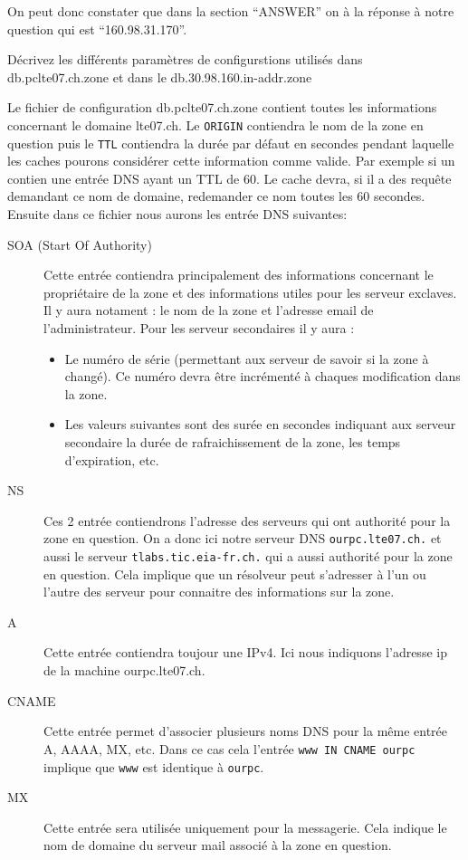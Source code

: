 \documentclass[a4paper, 12pt]{article}
\begin{document}

On peut donc constater que dans la section ``ANSWER'' on à la réponse à notre question qui est ``160.98.31.170''.

\begin{question}[resume]
\item Décrivez les différents paramètres de configurstions utilisés dans db.pclte07.ch.zone et dans le db.30.98.160.in-addr.zone
\end{question}


Le fichier de configuration db.pclte07.ch.zone contient toutes les informations concernant le domaine lte07.ch. Le \texttt{ORIGIN} contiendra le nom de la zone en question puis le \texttt{TTL} contiendra la durée par défaut en secondes pendant laquelle les caches pourons considérer cette information comme valide. Par exemple si un contien une entrée DNS ayant un TTL de 60. Le cache devra, si il a des requête demandant ce nom de domaine, redemander ce nom toutes les 60 secondes.
\newline
Ensuite dans ce fichier nous aurons les entrée DNS suivantes:
\begin{description}
 \item[SOA (Start Of Authority)]
 Cette entrée contiendra principalement des informations concernant le propriétaire de la zone et des informations utiles pour les serveur exclaves. Il y aura notament : le nom de la zone et l'adresse email de l'administrateur. Pour les serveur secondaires il y aura :
 \begin{itemize}
  \item Le numéro de série (permettant aux serveur de savoir si la zone à changé). Ce numéro devra être incrémenté à chaques modification dans la zone.
  \item Les valeurs suivantes sont des surée en secondes indiquant aux serveur secondaire la durée de rafraichissement de la zone, les temps d'expiration, etc.
 \end{itemize}
 \item[NS] Ces 2 entrée contiendrons l'adresse des serveurs qui ont authorité pour la zone en question. On a donc ici notre serveur DNS \texttt{ourpc.lte07.ch.} et aussi le serveur \texttt{tlabs.tic.eia-fr.ch.} qui a aussi authorité pour la zone en question. Cela implique que un résolveur peut s'adresser à l'un ou l'autre des serveur pour connaitre des informations sur la zone.
 \item[A] Cette entrée contiendra toujour une IPv4. Ici nous indiquons l'adresse ip de la machine ourpc.lte07.ch.
 \item[CNAME] Cette entrée permet d'associer plusieurs noms DNS pour la même entrée A, AAAA, MX, etc. Dans ce cas cela l'entrée \texttt{www IN CNAME ourpc} implique que \texttt{www} est identique à \texttt{ourpc}.
 \item[MX] Cette entrée sera utilisée uniquement pour la messagerie. Cela indique le nom de domaine du serveur mail associé à la zone en question.
\end{description}
\end{document}
